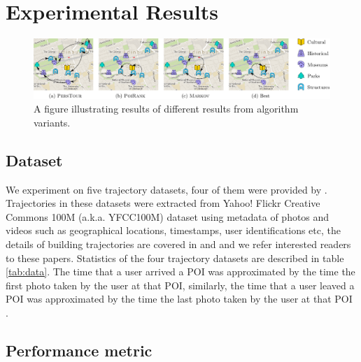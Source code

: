 \section{Experimental Results}
\label{sec:experiment}

\begin{figure}[t]
	\centering
	\includegraphics[width=\textwidth]{fig/example-tour.pdf}
	\caption{A figure illustrating results of different results from algorithm variants.
}
	\label{fig:exampleresult}
\end{figure}



\subsection{Dataset}
\label{sec:dataset}
We experiment on five trajectory datasets, four of them were provided by \cite{ijcai15}.
Trajectories in these datasets were extracted from Yahoo! Flickr Creative Commons 100M
(a.k.a. YFCC100M) dataset\cite{thomee2016yfcc100m} using metadata of photos and videos
such as geographical locations, timestamps, user identifications etc,
the details of building trajectories are covered in \cite{ht10} and \cite{ijcai15} and
we refer interested readers to these papers.
Statistics of the four trajectory datasets are described in table \ref{tab:data}.
%
The time that a user arrived a POI was approximated by the time the first photo taken by the user at that POI,
similarly, the time that a user leaved a POI was approximated by the time the last photo taken by the user at
that POI \cite{ht10, ijcai15}.


\subsection{Performance metric}
\label{sec:metric}




